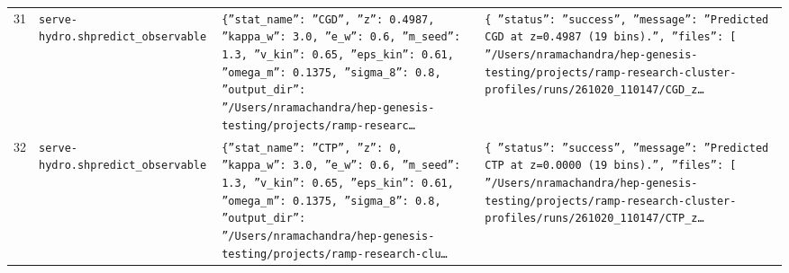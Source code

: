 \documentclass[11pt,a4paper]{article}
\begin{document}
\begin{longtable}{@{}p{}p{}p{}p{}@{}}
31 & \texttt{serve-hydro.sh}\newline\texttt{predict\_\allowbreak{}observable} & \texttt{\{''stat\_\allowbreak{}name'':\allowbreak{} ''CGD'',\allowbreak{} ''z'':\allowbreak{} 0.4987,\allowbreak{} ''kappa\_\allowbreak{}w'':\allowbreak{} 3.0,\allowbreak{} ''e\_\allowbreak{}w'':\allowbreak{} 0.6,\allowbreak{} ''m\_\allowbreak{}seed'':\allowbreak{} 1.3,\allowbreak{} ''v\_\allowbreak{}kin'':\allowbreak{} 0.65,\allowbreak{} ''eps\_\allowbreak{}kin'':\allowbreak{} 0.61,\allowbreak{} ''omega\_\allowbreak{}m'':\allowbreak{} 0.1375,\allowbreak{} ''sigma\_\allowbreak{}8'':\allowbreak{} 0.8,\allowbreak{} ''output\_\allowbreak{}dir'':\allowbreak{} ''/\allowbreak{}Users/\allowbreak{}nramachandra/\allowbreak{}hep-genesis-testing/\allowbreak{}projects/\allowbreak{}ramp-researc\ldots{}\allowbreak{}} & \texttt{\{   ''status'':\allowbreak{} ''success'',\allowbreak{}   ''message'':\allowbreak{} ''Predicted CGD at z=\allowbreak{}0.4987 (19 bins)\allowbreak{}.'',\allowbreak{}   ''files'':\allowbreak{} [     ''/\allowbreak{}Users/\allowbreak{}nramachandra/\allowbreak{}hep-genesis-testing/\allowbreak{}projects/\allowbreak{}ramp-research-cluster-profiles/\allowbreak{}runs/\allowbreak{}261020\_\allowbreak{}110147/\allowbreak{}CGD\_\allowbreak{}z\ldots{}\allowbreak{}} \\
32 & \texttt{serve-hydro.sh}\newline\texttt{predict\_\allowbreak{}observable} & \texttt{\{''stat\_\allowbreak{}name'':\allowbreak{} ''CTP'',\allowbreak{} ''z'':\allowbreak{} 0,\allowbreak{} ''kappa\_\allowbreak{}w'':\allowbreak{} 3.0,\allowbreak{} ''e\_\allowbreak{}w'':\allowbreak{} 0.6,\allowbreak{} ''m\_\allowbreak{}seed'':\allowbreak{} 1.3,\allowbreak{} ''v\_\allowbreak{}kin'':\allowbreak{} 0.65,\allowbreak{} ''eps\_\allowbreak{}kin'':\allowbreak{} 0.61,\allowbreak{} ''omega\_\allowbreak{}m'':\allowbreak{} 0.1375,\allowbreak{} ''sigma\_\allowbreak{}8'':\allowbreak{} 0.8,\allowbreak{} ''output\_\allowbreak{}dir'':\allowbreak{} ''/\allowbreak{}Users/\allowbreak{}nramachandra/\allowbreak{}hep-genesis-testing/\allowbreak{}projects/\allowbreak{}ramp-research-clu\ldots{}\allowbreak{}} & \texttt{\{   ''status'':\allowbreak{} ''success'',\allowbreak{}   ''message'':\allowbreak{} ''Predicted CTP at z=\allowbreak{}0.0000 (19 bins)\allowbreak{}.'',\allowbreak{}   ''files'':\allowbreak{} [     ''/\allowbreak{}Users/\allowbreak{}nramachandra/\allowbreak{}hep-genesis-testing/\allowbreak{}projects/\allowbreak{}ramp-research-cluster-profiles/\allowbreak{}runs/\allowbreak{}261020\_\allowbreak{}110147/\allowbreak{}CTP\_\allowbreak{}z\ldots{}\allowbreak{}} \\

\end{longtable}
\end{document}
